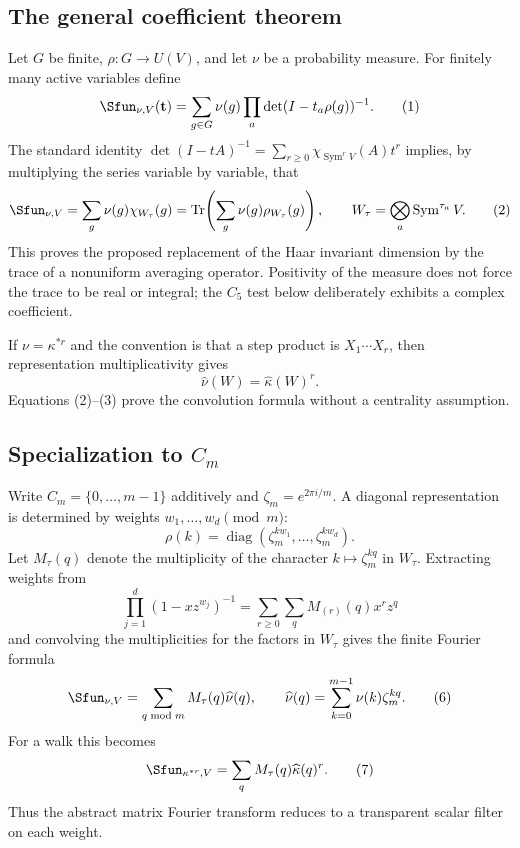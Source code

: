 \documentclass[10pt]{article}
\newcommand{\Sym}{\operatorname{Sym}}
\newcommand{\Tr}{\operatorname{Tr}}
\begin{document}
\subsection{The general coefficient theorem}
Let $G$ be finite, $\rho:G\to U(V)$, and let $\nu$ be a probability measure.
For finitely many active variables define
\begin{equation}
\Sfun_{\nu,V}(\mathbf t)=\sum_{g\in G}\nu(g)
 \prod_a\det(I-t_a\rho(g))^{-1}.                         \tag{1}
\end{equation}
The standard identity
$\det(I-tA)^{-1}=\sum_{r\geq0}\chi_{\Sym^r V}(A)t^r$
implies, by multiplying the series variable by variable, that
\begin{equation}
[\mathbf t^\tau]\Sfun_{\nu,V}
=\sum_g\nu(g)\chi_{W_\tau}(g)
=\Tr\!\left(\sum_g\nu(g)\rho_{W_\tau}(g)\right),
\qquad W_\tau=\bigotimes_a\Sym^{\tau_a}V.                \tag{2}
\end{equation}
This proves the proposed replacement of the Haar invariant dimension by the
trace of a nonuniform averaging operator.  Positivity of the measure does not
force the trace to be real or integral; the $C_5$ test below deliberately
exhibits a complex coefficient.

If $\nu=\kappa^{*r}$ and the convention is that a step product is
$X_1\cdots X_r$, then representation multiplicativity gives
\begin{equation}
\widehat\nu(W)=\widehat\kappa(W)^r.                        \tag{3}
\end{equation}
Equations (2)--(3) prove the convolution formula without a centrality
assumption.

\subsection{Specialization to \texorpdfstring{$C_m$}{C-m}}
Write $C_m=\{0,\ldots,m-1\}$ additively and
$\zeta_m=e^{2\pi i/m}$.  A diagonal representation is determined by weights
$w_1,\ldots,w_d\pmod m$:
\begin{equation}
\rho(k)=\operatorname{diag}(\zeta_m^{kw_1},\ldots,
\zeta_m^{kw_d}).                                           \tag{4}
\end{equation}
Let $M_\tau(q)$ denote the multiplicity of the character $k\mapsto
\zeta_m^{kq}$ in $W_\tau$.  Extracting weights from
\begin{equation}
\prod_{j=1}^d(1-xz^{w_j})^{-1}
=\sum_{r\geq0}\sum_q M_{(r)}(q)x^rz^q                    \tag{5}
\end{equation}
and convolving the multiplicities for the factors in $W_\tau$ gives the
finite Fourier formula
\begin{equation}
[\mathbf t^\tau]\Sfun_{\nu,V}
=\sum_{q\bmod m}M_\tau(q)\widehat\nu(q),
\qquad
\widehat\nu(q)=\sum_{k=0}^{m-1}\nu(k)\zeta_m^{kq}.        \tag{6}
\end{equation}
For a walk this becomes
\begin{equation}
[\mathbf t^\tau]\Sfun_{\kappa^{*r},V}
=\sum_qM_\tau(q)\widehat\kappa(q)^r.                     \tag{7}
\end{equation}
Thus the abstract matrix Fourier transform reduces to a transparent scalar
filter on each weight.
\end{document}
